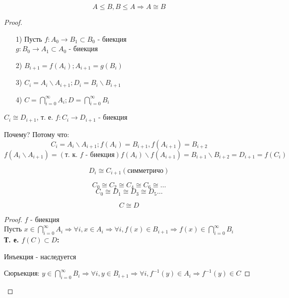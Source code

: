 \begin{theorem} 
\[
A \leq B, B \leq A \Rightarrow A \cong B 
\]
\end{theorem}
\begin{proof}
\begin{itemize}
  \item [1) ] Пусть $f: A_0 \rightarrow B_1 \subset B_0$ - биекция \\ $g: B_0 \rightarrow A_1 \subset A_0$ - биекция
  \item [2) ] $B_{i + 1} = f\left(A_i\right); A_{i + 1} = g\left(B_i\right)$
  \item [3) ] $C_i = A_i \backslash A_{i + 1}; D_i = B_i \backslash B_{i + 1}$
  \item [4) ] $C = \bigcap_{i = 0}^{\infty} A_i; D = \bigcap_{i = 0}^{\infty} B_i$
\end{itemize}
\begin{statement}
  $C_i \cong D_{i + 1}$, т. е. $f: C_i \rightarrow D_{i + 1}$ - биекция

  Почему? Потому что:
  \[
  C_i = A_i \backslash A_{i + 1}; f\left(A_i\right) = B_{i + 1}, f\left(A_{i + 1}\right) = B_{i + 2}
  \]
  \[
  f\left(A_i \backslash A_{i + 1}\right) =\left(\text{т. к. $f$ - биекция}\right) f\left(A_i\right) \backslash f\left(A_{i + 1}\right) = B_{i + 1} \backslash B_{i + 2} = D_{i + 1} = f\left(C_i\right)
  \]
\end{statement}
\begin{statement}
\[
D_i \cong C_{i + 1} \left(\text{симметричо}\right)
\]
\end{statement}
\begin{consequence}
\[
C_0 \cong C_2 \cong C_4 \cong C_6 \cong \ldots 
\]
\[
C_0 \cong D_1 \cong D_3 \cong D_5 \ldots 
\]
\end{consequence}
\begin{statement}
\[
C \cong D
\]
\begin{proof}
$f$ - биекция \\ Пусть $x \in \bigcap_{i = 0}^{\infty} A_i \Rightarrow \forall i, x \in A_i \Rightarrow \forall i, f\left(x\right) \in B_{i + 1} \Rightarrow f\left(x\right) \in \bigcap_{i = 0}^{\infty} B_i$ \\
\textbf{Т. е. $f\left(C\right) \subset D$:}

Инъекция - наследуется

Сюрьекция: $y \in \bigcap_{i = 0}^{\infty}B_i \Rightarrow \forall i, y \in B_{i + 1} \Rightarrow \forall i, f^{-1}\left(y\right) \in A_i \Rightarrow f^{-1}\left(y\right) \in C$
\end{proof}


\end{statement}
\end{proof}
